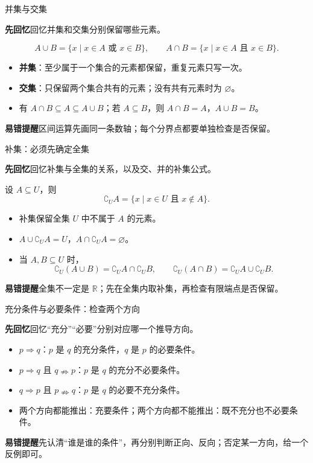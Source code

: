 \documentclass[UTF8,10pt,aspectratio=169]{ctexbeamer}
\newcommand{\Recall}[1]{\par\noindent\textcolor{KnowledgeBlue}{\textbf{先回忆}\quad #1}\par\vspace{0.3cm}}
\newcommand{\Pitfall}[1]{\par\vspace{0.22cm}\noindent\textbf{易错提醒}\quad #1\par}
\begin{document}
\begin{frame}[t]{并集与交集}
\large
\Recall{回忆并集和交集分别保留哪些元素。}
\pause
\[
A\cup B=\{x\mid x\in A\text{ 或 }x\in B\},\qquad
A\cap B=\{x\mid x\in A\text{ 且 }x\in B\}.
\]
\begin{itemize}
  \item \textbf{并集}：至少属于一个集合的元素都保留，重复元素只写一次。
  \item \textbf{交集}：只保留两个集合共有的元素；没有共有元素时为 $\varnothing$。
  \item 有 $A\cap B\subseteq A\subseteq A\cup B$；若 $A\subseteq B$，则 $A\cap B=A$，$A\cup B=B$。
\end{itemize}
\Pitfall{区间运算先画同一条数轴；每个分界点都要单独检查是否保留。}
\end{frame}

\begin{frame}[t]{补集：必须先确定全集}
\large
\Recall{回忆补集与全集的关系，以及交、并的补集公式。}
\pause
设 $A\subseteq U$，则
\[\complement_U A=\{x\mid x\in U\text{ 且 }x\notin A\}.\]
\begin{itemize}
  \item 补集保留全集 $U$ 中不属于 $A$ 的元素。
  \item $A\cup\complement_U A=U$，$A\cap\complement_U A=\varnothing$。
  \item 当 $A,B\subseteq U$ 时，
  \[\complement_U(A\cup B)=\complement_U A\cap\complement_U B,\qquad
    \complement_U(A\cap B)=\complement_U A\cup\complement_U B.\]
\end{itemize}
\Pitfall{全集不一定是 $\mathbb R$；先在全集内取补集，再检查有限端点是否保留。}
\end{frame}

\begin{frame}[t]{充分条件与必要条件：检查两个方向}
\large
\Recall{回忆“充分”“必要”分别对应哪一个推导方向。}
\pause
\begin{itemize}
  \item $p\Rightarrow q$：$p$ 是 $q$ 的充分条件，$q$ 是 $p$ 的必要条件。
  \item $p\Rightarrow q$ 且 $q\nRightarrow p$：$p$ 是 $q$ 的充分不必要条件。
  \item $q\Rightarrow p$ 且 $p\nRightarrow q$：$p$ 是 $q$ 的必要不充分条件。
  \item 两个方向都能推出：充要条件；两个方向都不能推出：既不充分也不必要条件。
\end{itemize}
\Pitfall{先认清“谁是谁的条件”，再分别判断正向、反向；否定某一方向，给一个反例即可。}
\end{frame}
\end{document}
